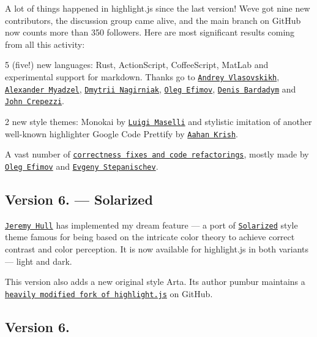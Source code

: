 A lot of things happened in highlight.\+js since the last version! We\textquotesingle{}ve got nine new contributors, the discussion group came alive, and the main branch on Git\+Hub now counts more than 350 followers. Here are most significant results coming from all this activity\+:


\begin{DoxyItemize}
\item 5 (five!) new languages\+: Rust, Action\+Script, Coffee\+Script, Mat\+Lab and experimental support for markdown. Thanks go to \href{https://github.com/vlasovskikh}{\tt Andrey Vlasovskikh}, \href{https://github.com/myadzel}{\tt Alexander Myadzel}, \href{https://github.com/dnagir}{\tt Dmytrii Nagirniak}, \href{https://github.com/Sannis}{\tt Oleg Efimov}, \href{https://github.com/btd}{\tt Denis Bardadym} and \href{https://github.com/seejohnrun}{\tt John Crepezzi}.
\item 2 new style themes\+: Monokai by \href{http://grigio.org/}{\tt Luigi Maselli} and stylistic imitation of another well-\/known highlighter Google Code Prettify by \href{http://anton.kovalyov.net/}{\tt Aahan Krish}.
\item A vast number of \href{https://github.com/isagalaev/highlight.js/commits/}{\tt correctness fixes and code refactorings}, mostly made by \href{https://github.com/Sannis}{\tt Oleg Efimov} and \href{https://github.com/bolknote}{\tt Evgeny Stepanischev}.
\end{DoxyItemize}

\subsection*{Version 6. — Solarized}

\href{https://github.com/sourrust}{\tt Jeremy Hull} has implemented my dream feature — a port of \href{http://ethanschoonover.com/solarized}{\tt Solarized} style theme famous for being based on the intricate color theory to achieve correct contrast and color perception. It is now available for highlight.\+js in both variants — light and dark.

This version also adds a new original style Arta. Its author pumbur maintains a \href{https://github.com/pumbur/highlight.js}{\tt heavily modified fork of highlight.\+js} on Git\+Hub.

\subsection*{Version 6.}

